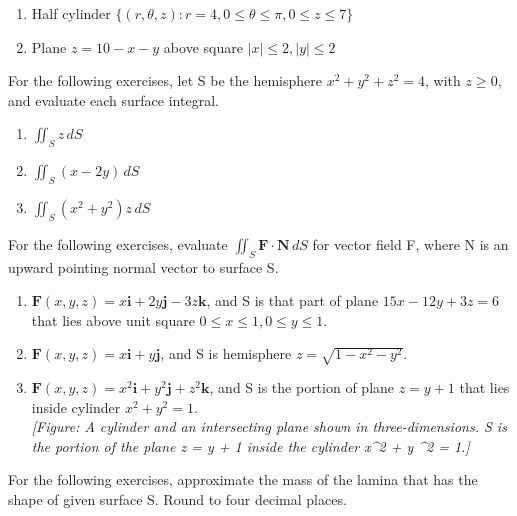 \documentclass{exercises}
\begin{document}
\begin{enumerate}[resume]
\item \techrequired Half cylinder $\{(r,\theta,z):r=4,0\le \theta \le \pi,0\le z\le7\}$
\item \techrequired Plane $z=10-x-y$ above square $|x|\le2,|y|\le2$
\end{enumerate}

For the following exercises, let S be the hemisphere $x^{2}+y^{2}+z^{2}=4$, with $z\ge0$, and evaluate each surface integral.

\begin{enumerate}[resume]
\item $\iint_{S}z\,dS$
\item $\iint_{S}(x-2y)\,dS$
\item $\iint_{S}(x^{2}+y^{2})z\,dS$
\end{enumerate}

For the following exercises, evaluate $\iint_{S}\mathbf{F}\cdot \mathbf{N}\,dS$ for vector field F, where N is an upward pointing normal vector to surface S.

\begin{enumerate}[resume]
\item $\mathbf{F}(x,y,z)=x\mathbf{i}+2y\mathbf{j}-3z\mathbf{k}$, and S is that part of plane $15x-12y+3z=6$ that lies above unit square $0\le x\le1,0\le y\le1$.
\item $\mathbf{F}(x,y,z)=x\mathbf{i}+y\mathbf{j}$, and S is hemisphere $z=\sqrt{1-x^{2}-y^{2}}$.
\item $\mathbf{F}(x,y,z)=x^{2}\mathbf{i}+y^{2}\mathbf{j}+z^{2}\mathbf{k}$, and S is the portion of plane $z=y+1$ that lies inside cylinder $x^{2}+y^{2}=1$. \\ \textit{[Figure: A cylinder and an intersecting plane shown in three-dimensions. S is the portion of the plane z = y + 1 inside the cylinder x\textasciicircum{}2 + y \textasciicircum{}2 = 1.]}
\end{enumerate}

For the following exercises, approximate the mass of the lamina that has the shape of given surface S. Round to four decimal places.
\end{document}
